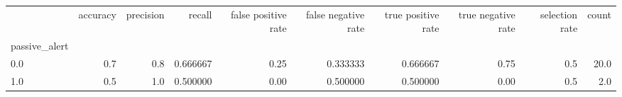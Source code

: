 \begin{tabular}{lrrrrrrrrr}
\toprule
{} &  accuracy &  precision &    recall &  false positive rate &  false negative rate &  true positive rate &  true negative rate &  selection rate &  count \\
passive\_alert &           &            &           &                      &                      &                     &                     &                 &        \\
\midrule
0.0           &       0.7 &        0.8 &  0.666667 &                 0.25 &             0.333333 &            0.666667 &                0.75 &             0.5 &   20.0 \\
1.0           &       0.5 &        1.0 &  0.500000 &                 0.00 &             0.500000 &            0.500000 &                0.00 &             0.5 &    2.0 \\
\bottomrule
\end{tabular}
